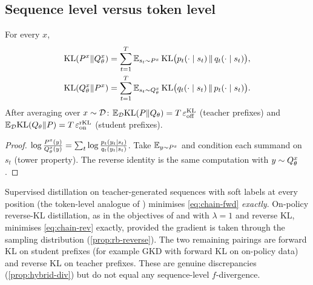 \subsection{Sequence level versus token level}\label{sec:chain}

\begin{theorem}\label{thm:chain}
\Pv\Ck For every $x$,
\begin{align}
\mathrm{KL}(P^{x}\|Q^{x}_{\theta})&=\sum_{t=1}^T\mathbb{E}_{s_t\sim P^{x}}\,\mathrm{KL}\big(p_t(\cdot\mid s_t)\,\|\,q_t(\cdot\mid s_t)\big),\label{eq:chain-fwd}\\
\mathrm{KL}(Q^{x}_{\theta}\|P^{x})&=\sum_{t=1}^T\mathbb{E}_{s_t\sim Q^{x}_{\theta}}\,\mathrm{KL}\big(q_t(\cdot\mid s_t)\,\|\,p_t(\cdot\mid s_t)\big).\label{eq:chain-rev}
\end{align}
After averaging over $x\sim\mathcal{D}$: $\mathbb{E}_{\mathcal{D}}\mathrm{KL}(P\|Q_\theta)=T\,\varepsilon_{\mathrm{off}}^{\mathrm{KL}}$ (teacher prefixes) and
$\mathbb{E}_{\mathcal{D}}\mathrm{KL}(Q_\theta\|P)=T\,\varepsilon_{\mathrm{on}}^{\mathrm{rKL}}$ (student prefixes).
\end{theorem}
\begin{proof}
$\log\frac{P^{x}(y)}{Q^{x}_{\theta}(y)}=\sum_t\log\frac{p_t(y_t\mid s_t)}{q_t(y_t\mid s_t)}$. Take $\mathbb{E}_{y\sim P^{x}}$ and
condition each summand on $s_t$ (tower property). The reverse identity is the same computation with
$y\sim Q^{x}_{\theta}$.
\end{proof}

\begin{remark}\label{rem:pairings}
Supervised distillation on teacher-generated sequences with soft labels at every position (the
token-level analogue of \citet{kim2016sequence}) minimises \eqref{eq:chain-fwd} \emph{exactly}. On-policy
reverse-KL distillation, as in the objectives of \citet{gu2024minillm} and \citet{agarwal2024gkd} with
$\lambda=1$ and reverse KL, minimises \eqref{eq:chain-rev} exactly, provided the gradient is taken through the
sampling distribution (\cref{prop:rb-reverse}). The two remaining pairings are forward KL on student
prefixes (for example GKD with forward KL on on-policy data) and reverse KL on teacher prefixes. These are
genuine discrepancies (\cref{prop:hybrid-div}) but do not equal any sequence-level $f$-divergence.
\end{remark}

